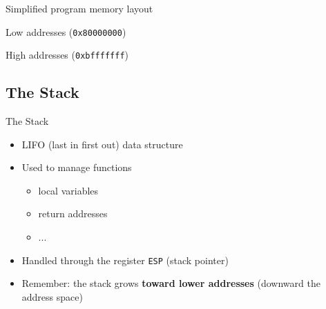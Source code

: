 \documentclass[]{beamer}
\begin{document}
\begin{frame}[fragile]{Simplified program memory layout}    
 \begin{center}
    {\footnotesize Low addresses ({\tt 0x80000000})}

    
    {\footnotesize High addresses ({\tt 0xbfffffff})}
    
\end{center}
\end{frame}
\subsection{The Stack}
\begin{frame}{The Stack}
\begin{itemize}
	\item LIFO (last in first out) data structure
	\item Used to manage functions
		\begin{itemize}
		\item local variables
		\item return addresses
		\item ...
		\end{itemize}
	\item Handled through the register {\tt ESP} (stack pointer)
	\item Remember: the stack grows \textbf{toward lower addresses} (downward the address space)
\end{itemize}
\end{frame}
\end{document}
